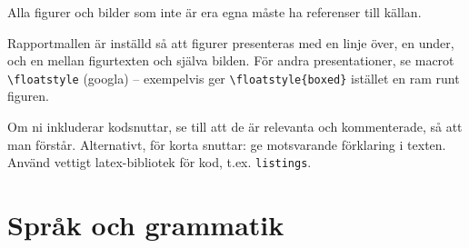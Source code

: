 \documentclass[a4paper,12pt]{article}
\begin{document}
Alla figurer och bilder som inte är era egna måste ha referenser till källan.

Rapportmallen är inställd så att figurer presenteras med en linje över, en under, och en mellan figurtexten och själva bilden. För andra presentationer, se macrot \verb|\floatstyle| (googla) -- exempelvis ger \verb|\floatstyle{boxed}| istället en ram runt figuren.

Om ni inkluderar kodsnuttar, se till att de är relevanta och kommenterade, så att man förstår.  Alternativt, för korta snuttar: ge motsvarande förklaring i texten.
Använd vettigt latex-bibliotek för kod, t.ex. \texttt{listings}.

\section{Språk och grammatik}
\label{sec:sprak-och-grammatik}
\end{document}

